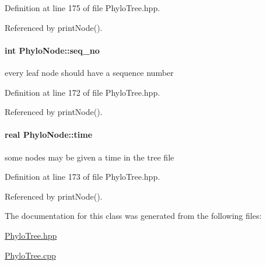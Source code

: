 \-Definition at line 175 of file \-Phylo\-Tree.\-hpp.



\-Referenced by print\-Node().

\hypertarget{classPhyloNode_ac50e08220f3cfb519d0e21ae4dd53dd2}{
\paragraph[{seq\-\_\-no}]{\setlength{\rightskip}{0pt plus 5cm}int {\bf \-Phylo\-Node\-::seq\-\_\-no}}}\label{classPhyloNode_ac50e08220f3cfb519d0e21ae4dd53dd2}


every leaf node should have a sequence number 



\-Definition at line 172 of file \-Phylo\-Tree.\-hpp.



\-Referenced by print\-Node().

\hypertarget{classPhyloNode_a24cf3f05065a31fde05a428d0eca87cf}{
\paragraph[{time}]{\setlength{\rightskip}{0pt plus 5cm}real {\bf \-Phylo\-Node\-::time}}}\label{classPhyloNode_a24cf3f05065a31fde05a428d0eca87cf}


some nodes may be given a time in the tree file 



\-Definition at line 173 of file \-Phylo\-Tree.\-hpp.



\-Referenced by print\-Node().



\-The documentation for this class was generated from the following files\-:\begin{DoxyCompactItemize}
\item 
\hyperlink{PhyloTree_8hpp}{\-Phylo\-Tree.\-hpp}\item 
\hyperlink{PhyloTree_8cpp}{\-Phylo\-Tree.\-cpp}\end{DoxyCompactItemize}
